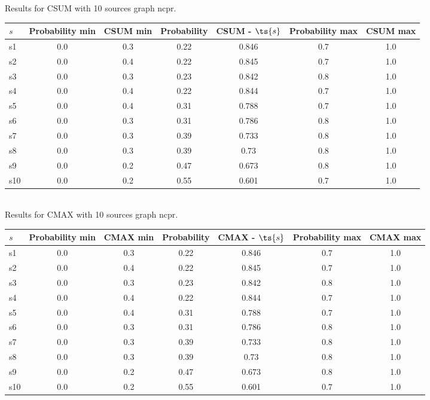 \documentclass{article}
\begin{document}
\noindent Results for CSUM with 10 sources graph ncpr.

\noindent\begin{tabular}{|l|c|c|c|c|c|c|}
\hline
$s$& Probability min & CSUM min & Probability & CSUM - $\ts{s}$ & Probability max & CSUM max\\
\hline
s1 &0.0 & 0.3 & 0.22 & 0.846 & 0.7 & 1.0\\
\hline
s2 &0.0 & 0.4 & 0.22 & 0.845 & 0.7 & 1.0\\
\hline
s3 &0.0 & 0.3 & 0.23 & 0.842 & 0.8 & 1.0\\
\hline
s4 &0.0 & 0.4 & 0.22 & 0.844 & 0.7 & 1.0\\
\hline
s5 &0.0 & 0.4 & 0.31 & 0.788 & 0.7 & 1.0\\
\hline
s6 &0.0 & 0.3 & 0.31 & 0.786 & 0.8 & 1.0\\
\hline
s7 &0.0 & 0.3 & 0.39 & 0.733 & 0.8 & 1.0\\
\hline
s8 &0.0 & 0.3 & 0.39 & 0.73 & 0.8 & 1.0\\
\hline
s9 &0.0 & 0.2 & 0.47 & 0.673 & 0.8 & 1.0\\
\hline
s10 &0.0 & 0.2 & 0.55 & 0.601 & 0.7 & 1.0\\
\hline
\end{tabular}\\

\noindent Results for CMAX with 10 sources graph ncpr.

\noindent\begin{tabular}{|l|c|c|c|c|c|c|}
\hline
$s$& Probability min & CMAX min & Probability & CMAX - $\ts{s}$ & Probability max & CMAX max\\
\hline
s1 &0.0 & 0.3 & 0.22 & 0.846 & 0.7 & 1.0\\
\hline
s2 &0.0 & 0.4 & 0.22 & 0.845 & 0.7 & 1.0\\
\hline
s3 &0.0 & 0.3 & 0.23 & 0.842 & 0.8 & 1.0\\
\hline
s4 &0.0 & 0.4 & 0.22 & 0.844 & 0.7 & 1.0\\
\hline
s5 &0.0 & 0.4 & 0.31 & 0.788 & 0.7 & 1.0\\
\hline
s6 &0.0 & 0.3 & 0.31 & 0.786 & 0.8 & 1.0\\
\hline
s7 &0.0 & 0.3 & 0.39 & 0.733 & 0.8 & 1.0\\
\hline
s8 &0.0 & 0.3 & 0.39 & 0.73 & 0.8 & 1.0\\
\hline
s9 &0.0 & 0.2 & 0.47 & 0.673 & 0.8 & 1.0\\
\hline
s10 &0.0 & 0.2 & 0.55 & 0.601 & 0.7 & 1.0\\
\hline
\end{tabular}\\
\end{document}
